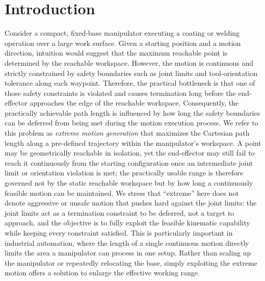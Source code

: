 \documentclass[journal, twoside]{IEEEtran}
\begin{document}
\section{Introduction}
Consider a compact, fixed-base manipulator executing a coating or welding operation over a large work surface. Given a starting position and a motion direction, intuition would suggest that the maximum reachable point is determined by the reachable workspace. However, the motion is continuous and strictly constrained by safety boundaries such as joint limits and tool-orientation tolerance along each waypoint. Therefore, the practical bottleneck is that one of those safety constraints is violated and causes termination long before the end-effector approaches the edge of the reachable workspace. Consequently, the practically achievable path length is influenced by how long the safety boundaries can be deferred from being met during the motion execution process. We refer to this problem as \textit{extreme motion generation} that maximizes the Cartesian path length along a pre-defined trajectory within the manipulator's workspace. A point may be geometrically reachable in isolation, yet the end-effector may still fail to reach it continuously from the starting configuration once an intermediate joint limit or orientation violation is met; the practically usable range is therefore governed not by the static reachable workspace but by how long a continuously feasible motion can be maintained. We stress that ``extreme'' here does not denote aggressive or unsafe motion that pushes hard against the joint limits: the joint limits act as a termination constraint to be deferred, not a target to approach, and the objective is to fully exploit the feasible kinematic capability while keeping every constraint satisfied. This is particularly important in industrial automation, where the length of a single continuous motion directly limits the area a manipulator can process in one setup. Rather than scaling up the manipulator or repeatedly relocating the base, simply exploiting the extreme motion offers a solution to enlarge the effective working range.
\end{document}
